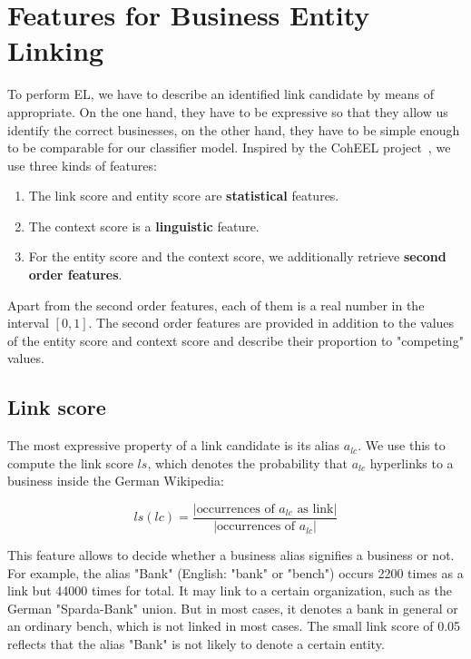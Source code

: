\section{Features for Business Entity Linking}
\label{sec:features}
To perform EL, we have to describe an identified link candidate by means of appropriate. On the one hand, they have to be expressive so that they allow us identify the correct businesses, on the other hand, they have to be simple enough to be comparable for our classifier model. Inspired by the CohEEL project~\cite{coheel}, we use three kinds of features:

\begin{enumerate}
\item The link score and entity score are \textbf{statistical} features.
\item The context score is a \textbf{linguistic} feature.
\item For the entity score and the context score, we additionally retrieve \textbf{second order features}.
\end {enumerate}

Apart from the second order features, each of them is a real number in the interval $[0, 1]$. The second order features are provided in addition to the values of the entity score and context score and describe their proportion to "competing" values.



\subsection{Link score}
\label{sec:link_score}
The most expressive property of a link candidate is its alias $a_{lc}$. We use this to compute the link score $ls$, which denotes the probability that $a_{lc}$ hyperlinks to a business inside the German Wikipedia:

\begin{equation*} %
ls(lc) = \frac{|\text{occurrences of $a_{lc}$ as link}|}{|\text{occurrences of $a_{lc}$}|}
\end{equation*}

This feature allows to decide whether a business alias signifies a business or not. For example, the alias "Bank" (English: "bank" or "bench") occurs 2200 times as a link but 44000 times for total. It may link to a certain organization, such as the German "Sparda-Bank" union. But in most cases, it denotes a bank in general or an ordinary bench, which is not linked in most cases. The small link score of 0.05 reflects that the alias "Bank" is not likely to denote a certain entity.



